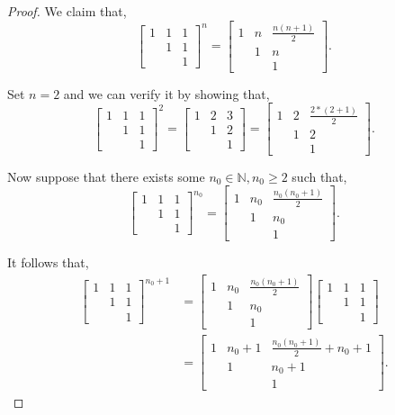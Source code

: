 \documentclass{amsbook}
\theoremstyle{definition}
\theoremstyle{remark}
\numberwithin{section}{chapter}
\numberwithin{equation}{chapter}
\begin{document}
\begin{proof}
We claim that,
\[
\begin{bmatrix}
1&1&1\\
  &1&1\\
  &  &1\end{bmatrix}^n=\begin{bmatrix}
 1& n& \frac{n(n + 1)}{2}\\
 & 1&             n\\
 & &             1\end{bmatrix}.
\]

Set $n=2$ and we can verify it by showing that,
\[
\begin{bmatrix}
1&1&1\\
  &1&1\\
  &  &1\end{bmatrix}^2=\begin{bmatrix}
     1     &2     &3\\
         &1     &2\\
          &     &1\end{bmatrix}=\begin{bmatrix}
 1& 2& \frac{2*(2 + 1)}{2}\\
 & 1&             2\\
 & &             1\end{bmatrix}.
\]

Now suppose that there exists some $n_0\in\mathbb{N}, n_0\geq 2$ such that,
\[
\begin{bmatrix}
1&1&1\\
  &1&1\\
  &  &1\end{bmatrix}^{n_0}=\begin{bmatrix}
 1& n_0& \frac{n_0(n_0 + 1)}{2}\\
 & 1&             n_0\\
 & &             1\end{bmatrix}.
\]

It follows that,
\begin{equation*}
\begin{split}
\begin{bmatrix}
1&1&1\\
  &1&1\\
  &  &1\end{bmatrix}^{n_0+1}&=\begin{bmatrix}
 1& n_0& \frac{n_0(n_0 + 1)}{2}\\
 & 1&             n_0\\
 & &             1\end{bmatrix}  
\begin{bmatrix}
1&1&1\\
  &1&1\\
  &  &1\end{bmatrix}\\
&=\begin{bmatrix}
1&n_0+1&\frac{n_0(n_0 + 1)}{2}+n_0+1\\
&1&n_0+1\\
&&1\end{bmatrix}.
\end{split}
\end{equation*}


\end{proof}
\end{document}
